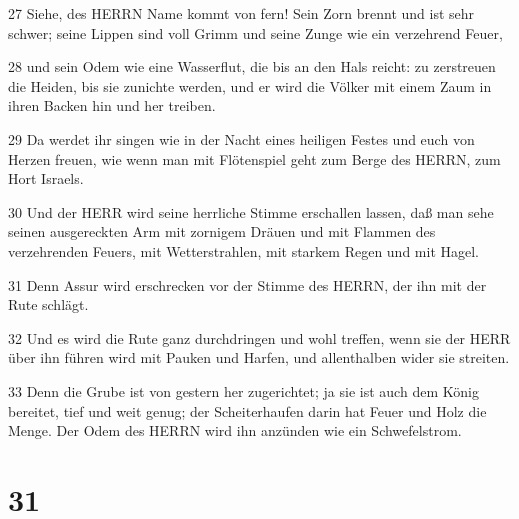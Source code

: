 \par 27 Siehe, des HERRN Name kommt von fern! Sein Zorn brennt und ist sehr schwer; seine Lippen sind voll Grimm und seine Zunge wie ein verzehrend Feuer,
\par 28 und sein Odem wie eine Wasserflut, die bis an den Hals reicht: zu zerstreuen die Heiden, bis sie zunichte werden, und er wird die Völker mit einem Zaum in ihren Backen hin und her treiben.
\par 29 Da werdet ihr singen wie in der Nacht eines heiligen Festes und euch von Herzen freuen, wie wenn man mit Flötenspiel geht zum Berge des HERRN, zum Hort Israels.
\par 30 Und der HERR wird seine herrliche Stimme erschallen lassen, daß man sehe seinen ausgereckten Arm mit zornigem Dräuen und mit Flammen des verzehrenden Feuers, mit Wetterstrahlen, mit starkem Regen und mit Hagel.
\par 31 Denn Assur wird erschrecken vor der Stimme des HERRN, der ihn mit der Rute schlägt.
\par 32 Und es wird die Rute ganz durchdringen und wohl treffen, wenn sie der HERR über ihn führen wird mit Pauken und Harfen, und allenthalben wider sie streiten.
\par 33 Denn die Grube ist von gestern her zugerichtet; ja sie ist auch dem König bereitet, tief und weit genug; der Scheiterhaufen darin hat Feuer und Holz die Menge. Der Odem des HERRN wird ihn anzünden wie ein Schwefelstrom.

\chapter{31}

